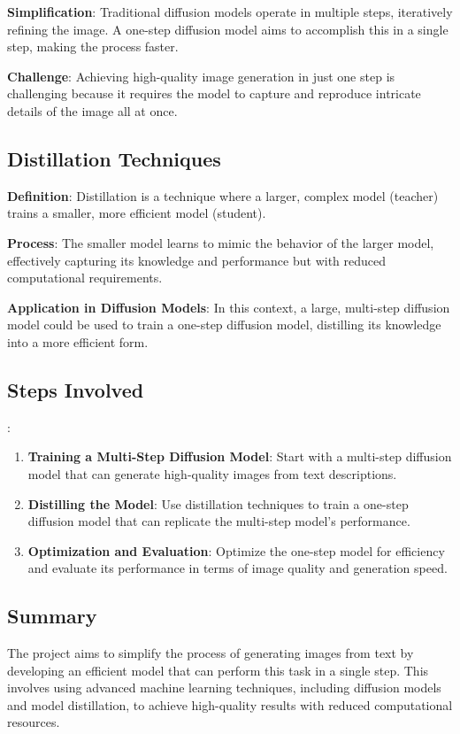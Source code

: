 \documentclass[11pt]{article}
\begin{document}
\textbf{Simplification}: Traditional diffusion models operate in multiple steps, iteratively refining the image. A one-step diffusion model aims to accomplish this in a single step, making the process faster.

\textbf{Challenge}: Achieving high-quality image generation in just one step is challenging because it requires the model to capture and reproduce intricate details of the image all at once.

\subsection{Distillation Techniques}

\textbf{Definition}: Distillation is a technique where a larger, complex model (teacher) trains a smaller, more efficient model (student).

\textbf{Process}: The smaller model learns to mimic the behavior of the larger model, effectively capturing its knowledge and performance but with reduced computational requirements.

\textbf{Application in Diffusion Models}: In this context, a large, multi-step diffusion model could be used to train a one-step diffusion model, distilling its knowledge into a more efficient form.


\subsection{Steps Involved}:

\begin{enumerate}
    \item \textbf{Training a Multi-Step Diffusion Model}: Start with a multi-step diffusion model that can generate high-quality images from text descriptions.
    \item \textbf{Distilling the Model}: Use distillation techniques to train a one-step diffusion model that can replicate the multi-step model's performance.
    \item \textbf{Optimization and Evaluation}: Optimize the one-step model for efficiency and evaluate its performance in terms of image quality and generation speed.
\end{enumerate}

\subsection{Summary}

The project aims to simplify the process of generating images from text by developing an efficient model that can perform this task in a single step. This involves using advanced machine learning techniques, including diffusion models and model distillation, to achieve high-quality results with reduced computational resources.
\end{document}
